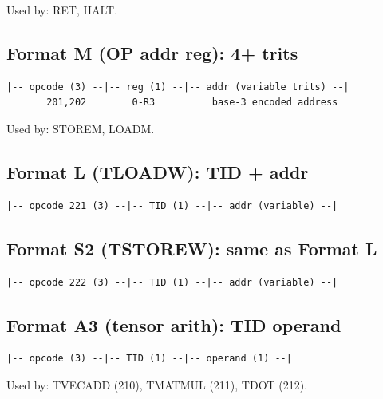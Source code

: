 \documentclass[12pt,a4paper,twoside]{book}
\theoremstyle{trinarytheorem}
\theoremstyle{trinarydefinition}
\begin{document}
Used by: RET, HALT.

\subsection{Format M (OP addr reg): 4+ trits}

\begin{verbatim}
|-- opcode (3) --|-- reg (1) --|-- addr (variable trits) --|
       201,202        0-R3          base-3 encoded address
\end{verbatim}

Used by: STOREM, LOADM.

\subsection{Format L (TLOADW): TID + addr}

\begin{verbatim}
|-- opcode 221 (3) --|-- TID (1) --|-- addr (variable) --|
\end{verbatim}

\subsection{Format S2 (TSTOREW): same as Format L}

\begin{verbatim}
|-- opcode 222 (3) --|-- TID (1) --|-- addr (variable) --|
\end{verbatim}

\subsection{Format A3 (tensor arith): TID operand}

\begin{verbatim}
|-- opcode (3) --|-- TID (1) --|-- operand (1) --|
\end{verbatim}

Used by: TVECADD (210), TMATMUL (211), TDOT (212).
\end{document}
